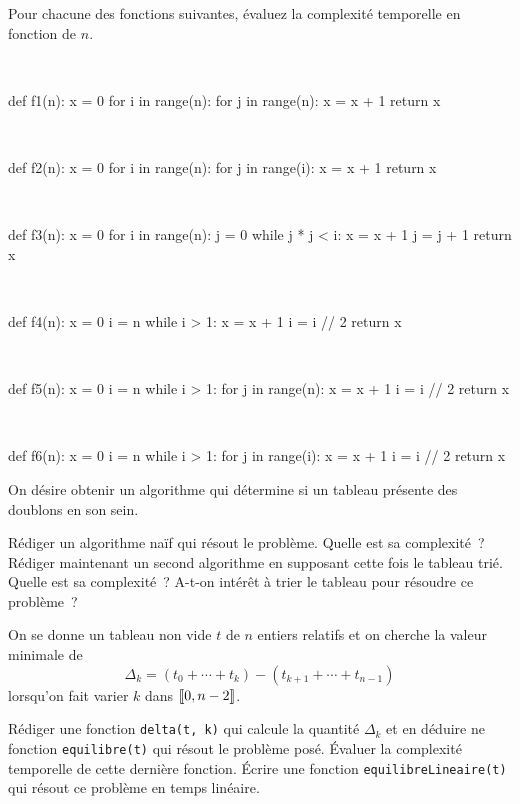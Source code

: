 \documentclass{magnolia}
\begin{document}
Pour chacune des fonctions suivantes, évaluez la complexité temporelle en fonction de $n$.
\begin{questions}
\question $\ $
\begin{pythoncode}
def f1(n):
    x = 0
    for i in range(n):
        for j in range(n):
            x = x + 1
    return x
\end{pythoncode}
\question $\ $
\begin{pythoncode}
def f2(n):
    x = 0
    for i in range(n):
        for j in range(i):
            x = x + 1
    return x
\end{pythoncode}
\question $\ $
\begin{pythoncode}
def f3(n):
    x = 0
    for i in range(n):
        j = 0
        while j * j < i:
            x = x + 1
            j = j + 1
    return x
\end{pythoncode}
\question $\ $
\begin{pythoncode}
def f4(n):
    x = 0
    i = n
    while i > 1:
        x = x + 1
        i = i // 2
    return x
\end{pythoncode}
\question $\ $
\begin{pythoncode}
def f5(n):
    x = 0
    i = n
    while i > 1:
        for j in range(n):
            x = x + 1
        i = i // 2
    return x
\end{pythoncode}
\question $\ $
\begin{pythoncode}
def f6(n):
    x = 0
    i = n
    while i > 1:
        for j in range(i):
            x = x + 1
        i = i // 2
    return x
\end{pythoncode}
\end{questions}

On désire obtenir un algorithme qui détermine si un tableau présente des doublons en son sein.
\begin{questions}
\question Rédiger un algorithme naïf qui résout le problème. Quelle est sa complexité~?
\question Rédiger maintenant un second algorithme en supposant cette fois le tableau trié.
  Quelle est sa complexité~? A-t-on intérêt à trier le tableau pour résoudre ce problème~?
\end{questions}

On se donne un tableau non vide $t$ de $n$ entiers relatifs et on cherche la valeur minimale
de
\[\Delta_k=(t_0+\cdots+t_k)-(t_{k+1}+\cdots+t_{n-1})\]
lorsqu'on fait varier $k$ dans $\left\llbracket 0,n-2\right\rrbracket$.
\begin{questions}
\question Rédiger une fonction \verb!delta(t, k)! qui calcule la quantité $\Delta_k$ et en
  déduire ne fonction \verb!equilibre(t)! qui résout le problème posé. Évaluer la
	complexité temporelle de cette dernière fonction.
\question Écrire une fonction \verb!equilibreLineaire(t)! qui résout ce problème en temps
  linéaire.
\end{questions}
\end{document}
